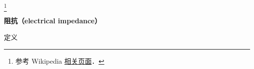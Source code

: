 
\begin{issues}
\issueDraft
\end{issues}


\footnote{参考 Wikipedia \href{https://en.wikipedia.org/wiki/Electrical_impedance}{相关页面}．}

\textbf{阻抗（electrical impedance）}

定义

